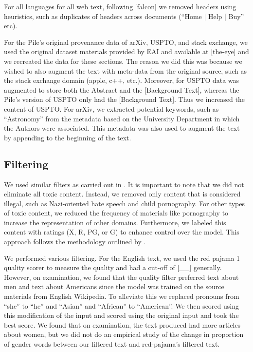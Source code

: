 For all languages for all web text, following [falcon] we removed headers using heuristics, such as duplicates of headers across documents (``Home | Help | Buy'' etc).

For the Pile’s original provenance data of arXiv, USPTO, and stack exchange, we used the original dataset materials provided by EAI and available at [the-eye] and we recreated the data for these sections. The reason we did this was because we wished to also augment the text with meta-data from the original source, such as the stack exchange domain (apple, c++, etc.). Moreover, for USPTO data was augmented to store both the Abstract and the [Background Text], whereas the Pile’s version of USPTO only had the [Background Text]. Thus we increased the content of USPTO. For arXiv, we extracted potential keywords, such as ``Astronomy'' from the metadata based on the University Department in which the Authors were associated. This metadata was also used to augment the text by appending to the beginning of the text.


\subsection{Filtering}

We used similar filters as carried out in \citet{scao2022bloom}.
It is important to note that we did not eliminate all toxic content. 
Instead, we removed only content that is considered illegal, such as Nazi-oriented hate speech and child pornography. 
For other types of toxic content, we reduced the frequency of materials like pornography to increase the representation of other domains.
Furthermore, we labeled this content with ratings (X, R, PG, or G) to enhance control over the model. This approach follows the methodology outlined by \citet{anil2023palm}.%


We performed various filtering. For the English text, we used the red pajama 1 quality scorer to measure the quality and had a cut-off of [\_\_] generally. However, on examination, we found that the quality filter preferred text about men and text about Americans since the model was trained on the source materials from English Wikipedia. To alleviate this we replaced pronouns from “she” to “he” and “Asian” and “African” to “American”. We then scored using this modification of the input and scored using the original input and took the best score. We found that on examination, the text produced had more articles about women, but we did not do an empirical study of the change in proportion of gender words between our filtered text and red-pajama’s filtered text.

